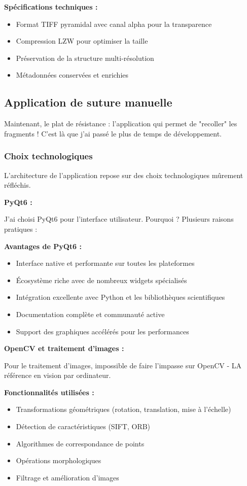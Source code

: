 \documentclass[11pt,a4paper]{report}
\begin{document}
\textbf{Spécifications techniques :}
\begin{itemize}
\item Format TIFF pyramidal avec canal alpha pour la transparence
\item Compression LZW pour optimiser la taille
\item Préservation de la structure multi-résolution
\item Métadonnées conservées et enrichies
\end{itemize}

\subsection{Application de suture manuelle}

Maintenant, le plat de résistance : l'application qui permet de "recoller" les fragments ! C'est là que j'ai passé le plus de temps de développement.

\subsubsection{Choix technologiques}

L'architecture de l'application repose sur des choix technologiques mûrement réfléchis.

\textbf{PyQt6 :}

J'ai choisi PyQt6 pour l'interface utilisateur. Pourquoi ? Plusieurs raisons pratiques :

\textbf{Avantages de PyQt6 :}
\begin{itemize}
\item Interface native et performante sur toutes les plateformes
\item Écosystème riche avec de nombreux widgets spécialisés
\item Intégration excellente avec Python et les bibliothèques scientifiques
\item Documentation complète et communauté active
\item Support des graphiques accélérés pour les performances
\end{itemize}

\textbf{OpenCV et traitement d'images :}

Pour le traitement d'images, impossible de faire l'impasse sur OpenCV - LA référence en vision par ordinateur.

\textbf{Fonctionnalités utilisées :}
\begin{itemize}
\item Transformations géométriques (rotation, translation, mise à l'échelle)
\item Détection de caractéristiques (SIFT, ORB)
\item Algorithmes de correspondance de points
\item Opérations morphologiques
\item Filtrage et amélioration d'images
\end{itemize}
\end{document}
